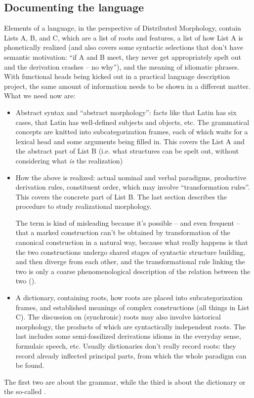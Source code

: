 {\subsection{Documenting the language}

Elements of a language, in the perspective of Distributed Morphology,
contain Lists A, B, and C, 
which are a list of roots and features, 
a list of how List A is phonetically realized 
(and also covers some syntactic selections that don't have semantic motivation: 
``if A and B meet, they never get appropriately spelt out and the derivation crashes -- no why''),
and the meaning of idiomatic phrases. 
With functional heads being kicked out in a practical language description project, 
the same amount of information needs to be shown in a different matter. 
What we need now are: 
\begin{itemize}
    \item Abstract syntax and ``abstract morphology'':
        facts like that Latin has six cases, 
        that Latin has well-defined subjects and objects, etc. 
        The grammatical concepts are knitted into subcategorization frames,
        each of which waits for a lexical head 
        and some arguments being filled in. 
        This covers the List A and the abstract part of List B 
        (i.e. what structures can be spelt out, 
        without considering what \emph{is} the realization)
    \item How the above is realized: 
        actual nominal and verbal paradigms, 
        productive derivation rules, 
        constituent order, which may involve ``transformation rules''.
        This covers 
        the concrete part of List B. 
        The last section describes the procedure to study realizational morphology.

        The term  is kind of misleading 
        because it's possible -- and even frequent -- 
        that a marked construction can't be obtained by transformation 
        of the canonical construction
        in a natural way, 
        because what really happens is 
        that the two constructions undergo shared stages of syntactic structure building,
        and then diverge from each other,
        and the transformational rule linking the two 
        is only a coarse phenomenological description of the relation between the two 
        ().
    \item A dictionary, 
        containing roots, how roots are placed into subcategorization frames, 
        and established meanings of complex constructions (all things in List C). 
        The discussion on (synchronic) roots may also involve 
        historical morphology,
        the products of which are syntactically independent roots.
        The last includes some semi-fossilized derivations 
        idioms in the everyday sense, formulaic speech, etc. 
        Usually dictionaries don't really record roots: 
        they record already inflected principal parts,
        from which the whole paradigm can be found.
\end{itemize}
The first two are about the grammar, 
while the third is about the dictionary
or the so-called .

}

